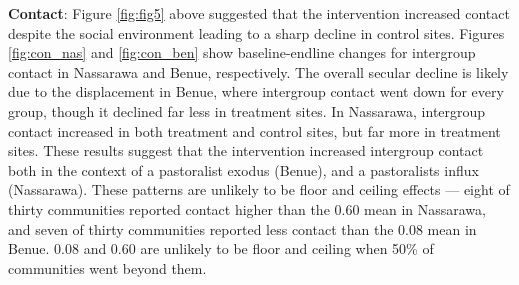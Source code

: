 \documentclass[11pt]{article}
\begin{document}
\textbf{Contact}: Figure \ref{fig:fig5} above suggested that the
intervention increased contact despite the social environment leading to
a sharp decline in control sites. Figures \ref{fig:con_nas} and
\ref{fig:con_ben} show baseline-endline changes for intergroup contact
in Nassarawa and Benue, respectively. The overall secular decline is
likely due to the displacement in Benue, where intergroup contact went
down for every group, though it declined far less in treatment sites. In
Nassarawa, intergroup contact increased in both treatment and control
sites, but far more in treatment sites. These results suggest that the
intervention increased intergroup contact both in the context of a
pastoralist exodus (Benue), and a pastoralists influx (Nassarawa). These
patterns are unlikely to be floor and ceiling effects --- eight of
thirty communities reported contact higher than the 0.60 mean in
Nassarawa, and seven of thirty communities reported less contact than
the 0.08 mean in Benue. 0.08 and 0.60 are unlikely to be floor and
ceiling when 50\% of communities went beyond them.
\end{document}
